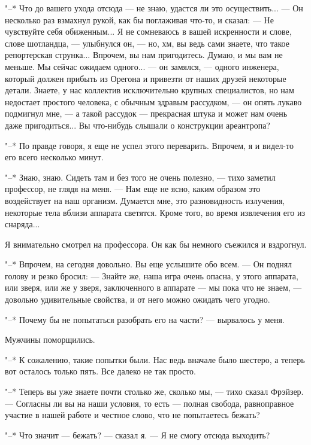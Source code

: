 "--* Что до вашего ухода отсюда --- не знаю, удастся ли это осуществить... ---
Он несколько раз взмахнул рукой, как бы поглаживая что-то, и сказал: ---  Не
чувствуйте себя обиженным... Я не сомневаюсь в вашей искренности и  слове,
слове шотландца, --- улыбнулся он, --- но, хм, вы ведь сами знаете, что  такое
репортерская струнка... Впрочем, вы нам пригодитесь. Думаю, и  мы  вам  не
меньше. Мы сейчас ожидаем одного...  ---  он  замялся,  ---  одного  инженера,
который должен прибыть из Орегона и привезти  от  наших  друзей  некоторые
детали. Знаете, у нас коллектив исключительно крупных специалистов, но нам
недостает простого человека, с  обычным  здравым  рассудком,  ---  он  опять
лукаво подмигнул мне, --- а такой рассудок --- прекрасная штука  и  может  нам
очень даже пригодиться... Вы что-нибудь слышали о конструкции ареантропа?

"--* По правде говоря, я еще не  успел  этого  переварить.  Впрочем,  я  и
видел-то его всего несколько минут.

"--* Знаю, знаю. Сидеть там и без того не очень полезно,  ---  тихо  заметил
профессор, не глядя на  меня.  ---  Нам  еще  не  ясно,  каким  образом  это
воздействует на наш организм. Думается мне, это  разновидность  излучения,
некоторые тела вблизи аппарата светятся. Кроме того, во  время  извлечения
его из снаряда...

Я внимательно смотрел на профессора.  Он  как  бы  немного  съежился  и
вздрогнул.

"--* Впрочем, на сегодня довольно. Вы еще услышите обо всем. ---  Он  поднял
голову и резко бросил: --- Знайте  же,  наша  игра  очень  опасна,  у  этого
аппарата, или зверя, или же у зверя, заключенного в аппарате --- мы пока что
не знаем, --- довольно удивительные свойства, и от него можно  ожидать  чего
угодно.

"--* Почему бы не попытаться разобрать его на части? --- вырвалось у меня.

Мужчины поморщились.

"--* К сожалению, такие попытки были. Нас ведь  вначале  было  шестеро,  а
теперь вот осталось только пять. Все далеко не так просто.

"--* Теперь вы уже знаете почти столько же,  сколько  мы,  ---  тихо  сказал
Фрэйзер. --- Согласны ли вы на наши  условия,  то  есть  ---  полная  свобода,
равноправное участие в нашей работе и честное слово,  что  не  попытаетесь
бежать?

"--* Что значит --- бежать? --- сказал я. --- Я не смогу отсюда выходить?

